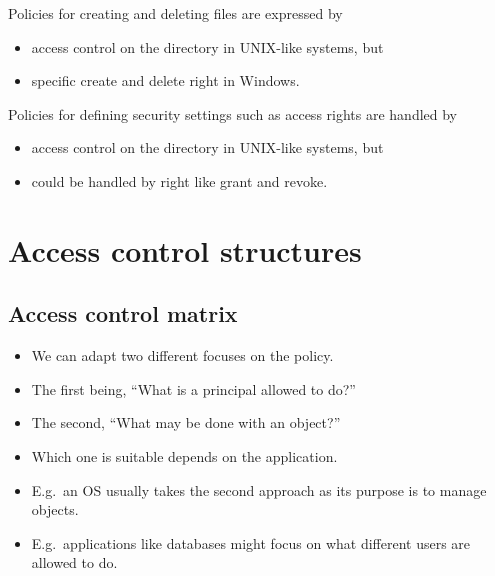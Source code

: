 \documentclass{beamer}
\begin{document}
\begin{frame}
  \begin{example}
    Policies for creating and deleting files are expressed by
    \begin{itemize}
      \item access control on the directory in UNIX-like systems, but
      \item specific create and delete right in Windows.
    \end{itemize}
  \end{example}

  \pause{}

  \begin{example}
    Policies for defining security settings such as access rights are handled 
    by
    \begin{itemize}
      \item access control on the directory in UNIX-like systems, but
      \item could be handled by right like grant and revoke.
    \end{itemize}
  \end{example}
\end{frame}


\section{Access control structures}

\subsection{Access control matrix}

\begin{frame}
  \begin{itemize}
    \item We can adapt two different focuses on the policy.

    \item The first being, ``What is a principal allowed to do?''

    \item The second, ``What may be done with an object?''

      \pause{}

    \item Which one is suitable depends on the application.

    \item E.g.\ an OS usually takes the second approach as its purpose is to 
      manage objects.

    \item E.g.\ applications like databases might focus on what different users 
      are allowed to do.
  \end{itemize}
\end{frame}
\end{document}
